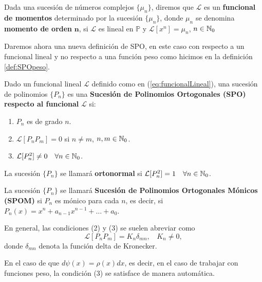 \begin{definicion}
    Dada una sucesión de números complejos $\{\mu_n\}$, diremos que $\mathcal{L}$ es un \textbf{funcional de momentos} determinado por la sucesión $\{\mu_n\}$, donde $\mu_n$ se denomina \textbf{momento de orden }$\mathbf n$, si $\mathcal{L}$ es lineal en $\mathbb P$ y $\mathcal{L}[x^n]=\mu_n$, $n\in\mathbb{N}_0$
\end{definicion}

Daremos ahora una nueva definición de SPO, en este caso con respecto a un funcional lineal y no respecto a una función peso como hicimos en la definición \ref{def:SPOpeso}.

\begin{definicion}
    \label{def:SPOfuncional}
    Dado un funcional lineal $\mathcal{L}$ definido como en (\ref{eq:funcionalLineal}), una sucesión de polinomios $\{P_n\}$ es una \textbf{Sucesión de Polinomios Ortogonales (SPO) respecto al funcional }$\mathcal{L}$ si:
    \begin{enumerate}
        \item $P_n$ es de grado $n$.
        \item $\mathcal{L}[P_n P_m]=0$ si $n\not=m$, $n,m\in\mathbb{N}_0$.
        \item $\mathcal{L}[P_n^2]\not=0 \ \ \ \forall n\in\mathbb{N}_0$.
    \end{enumerate} 

    La sucesión $\{P_n\}$ se llamará \textbf{ortonormal} si $\mathcal{L}[P_n^2]=1 \ \ \ \forall n\in\mathbb{N}_0$.

    La sucesión $\{P_n\}$ se llamará \textbf{Sucesión de Polinomios Ortogonales Mónicos (SPOM)} si $P_n$ es mónico para cada $n$, es decir, si $P_n(x)=x^n + a_{n-1}x^{n-1}+\dots + a_0$.


\end{definicion}

En general, las condiciones (2) y (3) se suelen abreviar como 
$$
\mathcal{L}[P_n P_m]=K_n\delta_{mn}, \ \ \ \ K_n\not=0,
$$
donde $\delta_{mn}$ denota la función delta de Kronecker. 

En el caso de que $d\psi(x)=\rho(x)dx$, es decir, en el caso de trabajar con funciones peso, la condición (3) se satisface de manera automática.

